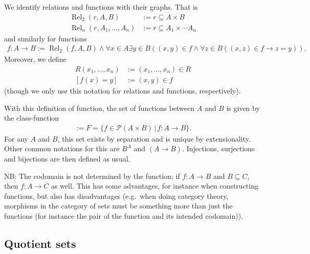 \documentclass{scrartcl}
\theoremstyle{definition}
\theoremstyle{plain}
\theoremstyle{remark}
\newcommand{\limp}{\rightarrow}
\newcommand{\Pow}{\mathcal{P}}
\newcommand{\sep}{\,|\,}
\newcommand{\eqdef}{:=}
\DeclareMathOperator{\Rel}{Rel}
\begin{document}
We identify relations and functions with their graphs. That is
\begin{align*}
  \Rel_2(r,A,B) &\eqdef r \subseteq A \times B\\
  \Rel_n(r,A_1,\dotsc,A_n) &\eqdef r \subseteq A_1 \times \dotsb A_n
\end{align*}
and similarly for functions
\begin{align*}
  f : A \longrightarrow B \eqdef \Rel_2(f,A,B) \land \forall x \in A \exists y \in B ((x,y) \in f \land \forall z \in B ((x,z) \in f \limp z = y))\mbox{.}
\end{align*}
Moreover, we define
\begin{align*}
  R(x_1,\dotsc,x_n) &\eqdef (x_1,\dotsc,x_n) \in R\\
  [f(x) = y] &\eqdef (x,y) \in f
\end{align*}
(though we only use this notation for relations and functions, respectively).

With this definition of function, the set of functions between $A$ and $B$ is given by the class-function
\begin{align*}
  [F = {}^AB] \eqdef F = \{f \in \Pow(A \times B) \sep f : A \longrightarrow B\}\mbox{.}
\end{align*}
For any $A$ and $B$, this set exists by separation and is unique by extensionality. Other common notations for this are $B^A$ and $(A \longrightarrow B)$. Injections, surjections and bijections are then defined as usual.

NB: The codomain is not determined by the function; if $f : A \longrightarrow B$ and $B \subseteq C$, then $f : A \longrightarrow C$ as well. This has some advantages, for instance when constructing functions, but also has disadvantages (e.g.~when doing category theory, morphisms in the category of sets must be something more than just the functions (for instance the pair of the function and its intended codomain)).

\subsection{Quotient sets}
\label{subsec:quotient}
\end{document}
